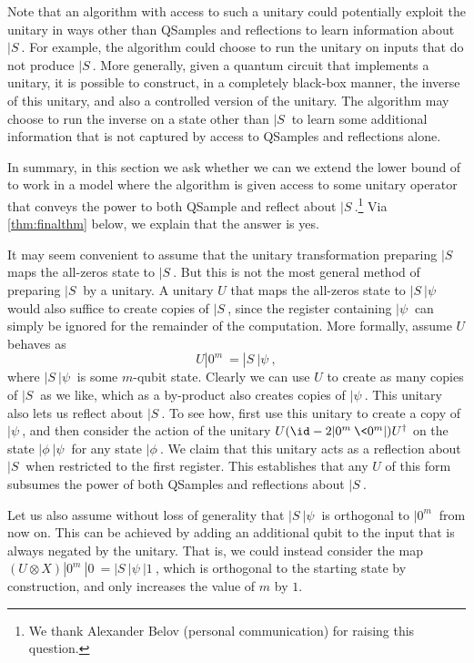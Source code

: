 Note that
an algorithm with access to such a unitary could potentially exploit the unitary in ways other
than QSamples and reflections to learn information about $|S\>$. 
For example, the algorithm could choose to run the unitary on inputs that do not produce $|S\>$.
More generally, given a quantum circuit that implements a unitary, it is possible to construct, in a completely black-box manner, the inverse of this unitary, and also a controlled version of the unitary.
The algorithm may choose to run the inverse on a state other than $|S\>$ to learn some additional information that is not captured by access
to QSamples and reflections alone.

In summary, in this section
we ask whether we can we extend the lower bound of  to work in a model where the algorithm is given access to some unitary operator that conveys the power to both QSample and reflect about $|S\>$.\footnote{We thank Alexander Belov (personal communication) for raising this question.} 
Via \cref{thm:finalthm} below, we explain that the answer is yes.


\medskip

It may seem convenient to assume that the unitary
transformation preparing $|S\>$ 
maps the all-zeros state to $|S\>$.
But this is not the most general method of preparing $|S\>$ by a unitary.
A unitary $U$ that maps the all-zeros state to $|S\>|\psi\>$ would also suffice to create copies of $|S\>$, since the register containing $|\psi\>$ can simply be ignored for the remainder of the computation.
More formally, assume $U$ behaves as 
\begin{equation}
    U|0^m\> = |S\>|\psi\>,
\end{equation}
where $|S\>|\psi\>$ is some $m$-qubit state.
Clearly we can use $U$ to create as many copies of $|S\>$ as we like, 
which as a by-product also creates copies of $|\psi\>$.
This unitary also lets us reflect about $|S\>$. 
To see how, first use this unitary to create a copy of $|\psi\>$, and then consider the action of the unitary $U(\id - 2|0^m\>\<0^m|)U^\dagger$ on the state $|\phi\>|\psi\>$ for any state $|\phi\>$. We claim that this unitary acts as a reflection about $|S\>$ when restricted to the first register. 
This establishes that any $U$ of this form subsumes the power of both QSamples and reflections about $|S\>$.

Let us also assume without loss of generality that $|S\>|\psi\>$ is orthogonal to $|0^m\>$ from now on. This can be achieved by adding an additional qubit to the input that is always negated by the unitary. That is, we could instead consider the map $(U \otimes X)|0^m\>|0\> = |S\>|\psi\>|1\>$, which is orthogonal to the starting state by construction, and only increases the value of $m$ by $1$.

